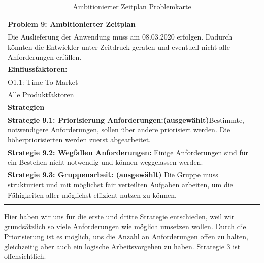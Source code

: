 \documentclass[enabledeprecatedfontcommands,fontsize=12pt,paper=a4,twoside]{scrartcl}
\begin{document}
\begin{table}[H]
    \centering
    \begin{tabular}{|p{15cm}|}
    \hline
          \textbf{Problem 9:} Ambitionierter Zeitplan
          \\ \hline
          Die Auslieferung der Anwendung muss am 08.03.2020 erfolgen. Dadurch könnten die Entwickler unter Zeitdruck geraten und eventuell nicht alle Anforderungen erfüllen.
          \\ \hline
          \textbf{Einflussfaktoren: } \\
          O1.1: Time-To-Market\\
	Alle Produktfaktoren \\
          \hline
          \textbf{Strategien} \\ \hline
            {}          
           \label{strategie:9.1}     
         \textbf{Strategie 9.1: Priorisierung Anforderungen:(ausgewählt)}Bestimmte, notwendigere Anforderungen, sollen über andere priorisiert werden. Die höherpriorisierten werden zuerst abgearbeitet. \\
           {}          
           \label{strategie:9.2}     
          \textbf{Strategie 9.2: Wegfallen Anforderungen:} Einige Anforderungen sind für ein Bestehen nicht notwendig und können weggelassen werden.\\
            {}          
           \label{strategie:9.3}     
          \textbf{Strategie 9.3: Gruppenarbeit: (ausgewählt)} Die Gruppe muss strukturiert und mit möglichst fair verteilten Aufgaben arbeiten, um die Fähigkeiten aller möglichst effizient nutzen zu können. \\
          \\ \hline
    \end{tabular}
    \caption{Ambitionierter Zeitplan Problemkarte}
    \label{tab:ProblemKarte9}
\end{table}
Hier haben wir uns für die erste und dritte Strategie entschieden, weil wir grundsätzlich so viele Anforderungen wie möglich umsetzen wollen. Durch die Priorisierung ist es möglich, uns die Anzahl an Anforderungen offen zu halten, gleichzeitig aber auch ein logische Arbeitsvorgehen zu haben. Strategie 3 ist offensichtlich. \\
\end{document}
